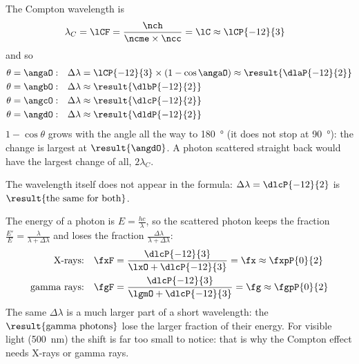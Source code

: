 \begin{abcliste}
\abc The Compton wavelength is
\begin{align}
 \lambda_C &= \lCF = \frac{\nch}{\ncme\times\ncc} = \lC \approx \lCP{-12}{3}
\end{align}
and so
\begin{align}
 \theta = \angaO:&\quad \Delta\lambda = \lCP{-12}{3}\times\left(1-\cos\angaO\right) \approx \result{\dlaP{-12}{2}} \\
 \theta = \angbO:&\quad \Delta\lambda \approx \result{\dlbP{-12}{2}} \\
 \theta = \angcO:&\quad \Delta\lambda \approx \result{\dlcP{-12}{2}} \\
 \theta = \angdO:&\quad \Delta\lambda \approx \result{\dldP{-12}{2}}
\end{align}
$1-\cos\theta$ grows with the angle all the way to \SI{180}{\degree} (it does not stop at \SI{90}{\degree}): the change is largest at $\result{\angdO}$. A photon scattered straight back would have the largest change of all, $2\lambda_C$.

\abc The wavelength itself does not appear in the formula: $\Delta\lambda = \dlcP{-12}{2}$ is $\result{\text{the same for both}}$.

\abc The energy of a photon is $E = \frac{h c}{\lambda}$, so the scattered photon keeps the fraction $\frac{E'}{E} = \frac{\lambda}{\lambda+\Delta\lambda}$ and loses the fraction $\frac{\Delta\lambda}{\lambda+\Delta\lambda}$:
\begin{align}
 \text{X-rays:}&\quad \fxF = \frac{\dlcP{-12}{3}}{\lxO+\dlcP{-12}{3}} = \fx \approx \fxpP{0}{2} \\
 \text{gamma rays:}&\quad \fgF = \frac{\dlcP{-12}{3}}{\lgmO+\dlcP{-12}{3}} = \fg \approx \fgpP{0}{2}
\end{align}
The same $\Delta\lambda$ is a much larger part of a short wavelength: the $\result{\text{gamma photons}}$ lose the larger fraction of their energy. For visible light (\SI{500}{\nm}) the shift is far too small to notice: that is why the Compton effect needs X-rays or gamma rays.
\end{abcliste}
